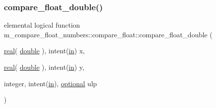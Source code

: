 \subsubsection{\texorpdfstring{compare\+\_\+float\+\_\+double()}{compare\_float\_double()}}
{\footnotesize\ttfamily elemental logical function m\+\_\+compare\+\_\+float\+\_\+numbers\+::compare\+\_\+float\+::compare\+\_\+float\+\_\+double (\begin{DoxyParamCaption}\item[{\hyperlink{read__watch_83_8txt_abdb62bde002f38ef75f810d3a905a823}{real}( \hyperlink{namespacem__compare__float__numbers_af4b789cd6e1a2abcd412eaf29e91ea0c}{double} ), intent(\hyperlink{M__journal_83_8txt_afce72651d1eed785a2132bee863b2f38}{in})}]{x,  }\item[{\hyperlink{read__watch_83_8txt_abdb62bde002f38ef75f810d3a905a823}{real}( \hyperlink{namespacem__compare__float__numbers_af4b789cd6e1a2abcd412eaf29e91ea0c}{double} ), intent(\hyperlink{M__journal_83_8txt_afce72651d1eed785a2132bee863b2f38}{in})}]{y,  }\item[{integer, intent(\hyperlink{M__journal_83_8txt_afce72651d1eed785a2132bee863b2f38}{in}), \hyperlink{option__stopwatch_83_8txt_aa4ece75e7acf58a4843f70fe18c3ade5}{optional}}]{ulp }\end{DoxyParamCaption})\hspace{0.3cm}{\ttfamily [private]}}

\mbox{\label{interfacem__compare__float__numbers_1_1compare__float_a756f4b26fbc31b581df644519f3a9e1f}} 
